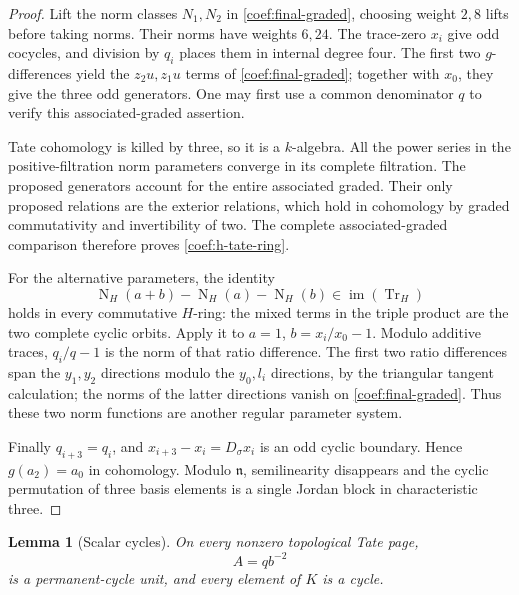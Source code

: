 \documentclass[11pt]{article}
\newtheorem{lemma}[theorem]{Lemma}
\theoremstyle{definition}
\theoremstyle{remark}
\numberwithin{equation}{section}
\begin{document}
\begin{proof}
Lift the norm classes \(N_1,N_2\) in \eqref{coef:final-graded}, choosing
weight \(2,8\) lifts before taking norms.  Their norms have weights
\(6,24\).  The trace-zero \(x_i\) give odd cocycles, and division by
\(q_i\) places them in internal degree four.  The first two
\(g\)-differences yield the \(z_2u,z_1u\) terms of
\eqref{coef:final-graded}; together with \(x_0\), they give the three
odd generators.  One may first use a common denominator \(q\) to
verify this associated-graded assertion.

Tate cohomology is killed by three, so it is a \(k\)-algebra.
All the power series in the positive-filtration norm parameters
converge in its complete filtration.  The proposed generators
account for the entire associated graded.  Their only proposed
relations are the exterior relations, which hold in cohomology by
graded commutativity and invertibility of two.  The complete
associated-graded comparison therefore proves
\eqref{coef:h-tate-ring}.

For the alternative parameters, the identity
\[
 \operatorname{N}_H(a+b)-\operatorname{N}_H(a)-\operatorname{N}_H(b)\in\operatorname{im}(\operatorname{Tr}_H)
\]
holds in every commutative \(H\)-ring: the mixed terms in the triple
product are the two complete cyclic orbits.  Apply it to
\(a=1\), \(b=x_i/x_0-1\).
Modulo additive traces, \(q_i/q-1\) is the norm of that ratio
difference.  The first two ratio differences span the \(y_1,y_2\)
directions modulo the \(y_0,l_i\) directions, by the triangular
tangent calculation; the norms of the latter directions vanish on
\eqref{coef:final-graded}.  Thus these two norm functions are another
regular parameter system.

Finally \(q_{i+3}=q_i\), and \(x_{i+3}-x_i=D_\sigma x_i\) is an odd
cyclic boundary.  Hence \(g(a_2)=a_0\) in cohomology.
Modulo \(\mathfrak n\), semilinearity disappears and the cyclic
permutation of three basis elements is a single Jordan block in
characteristic three.
\end{proof}

\begin{lemma}[Scalar cycles]\label{coef:scalar-cycles}
On every nonzero topological Tate page,
\[
 A=qb^{-2}
\]
is a permanent-cycle unit, and every element of \(K\) is a cycle.
\end{lemma}
\end{document}
